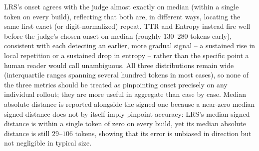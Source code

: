 \documentclass{article}
\begin{document}
\begin{table}[h]
\centering
{}
\caption{Signed onset distance (judge onset minus metric onset, in tokens)
for rollouts where both are defined, test split only.}
\label{tab:unified-onset}
\end{table}

LRS's onset agrees with the judge almost exactly on median (within a single
token on every build), reflecting that both are, in different ways,
locating the same first exact (or digit-normalized) repeat. TTR and Entropy
instead fire well before the judge's chosen onset on median (roughly
$130$--$280$ tokens early), consistent with each detecting an earlier, more
gradual signal -- a sustained rise in local repetition or a sustained drop
in entropy -- rather than the specific point a human reader would call
unambiguous. All three distributions remain wide (interquartile ranges
spanning several hundred tokens in most cases), so none of the three
metrics should be treated as pinpointing onset precisely on any individual
rollout; they are more useful in aggregate than case by case. Median
absolute distance is reported alongside the signed one because a near-zero
median signed distance does not by itself imply pinpoint accuracy: LRS's
median signed distance is within a single token of zero on every build, yet
its median absolute distance is still $29$--$106$ tokens, showing that its
error is unbiased in direction but not negligible in typical size.
\end{document}
